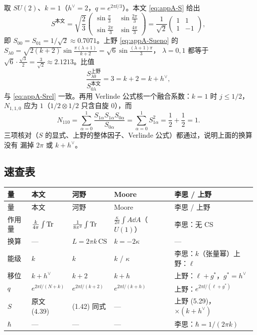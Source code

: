 取 $SU(2)$、$k=1$（$h^\vee=2$，$q=e^{2\pi\ii/3}$）。本文 \eqref{eq:appA-S} 给出
\begin{equation}
S^{\text{本文}}=\sqrt{\frac23}
\begin{pmatrix}
\sin\frac{\pi}{3} & \sin\frac{2\pi}{3}\\[2pt]
\sin\frac{2\pi}{3} & \sin\frac{4\pi}{3}
\end{pmatrix}
=\frac{1}{\sqrt2}
\begin{pmatrix}1&1\\1&-1\end{pmatrix},
\end{equation}
即 $S_{00}=S_{01}=1/\sqrt2\approx0.7071$。上野 \eqref{eq:appA-Sueno} 的
$S_{\lambda0}=\sqrt{2(k+2)}\sin\frac{\pi(\lambda+1)}{k+2}=\sqrt6\sin\frac{(\lambda+1)\pi}{3}$，
$\lambda=0,1$ 都等于 $\sqrt6\cdot\frac{\sqrt3}{2}=\frac{3}{\sqrt2}\approx2.1213$。比值
\begin{equation}
\frac{S_{\lambda0}^{\text{上野}}}{S_{0\lambda}^{\text{本文}}}=3=k+2=k+h^\vee,
\end{equation}
与 \eqref{eq:appA-Srel} 一致。再用 Verlinde 公式核一个融合系数：$k=1$ 时
$j\le1/2$，$N_{1,1,0}$ 应为 $1$（$1/2\otimes1/2$ 只含自旋 $0$），而
\begin{equation}
N_{110}=\sum_{\alpha=0}^{1}\frac{S_{1\alpha}S_{1\alpha}S_{0\alpha}}{S_{0\alpha}}
=\sum_{\alpha=0}^{1}S_{1\alpha}^2=\frac12+\frac12=1 .
\end{equation}
三项核对（$S$ 的显式、上野的整体因子、Verlinde 公式）都通过，说明上面的换算没有
漏掉 $2\pi$ 或 $k+h^\vee$。

\subsection{速查表}

\begin{center}
\footnotesize
\begin{longtable}{@{}p{1.8cm}p{2.5cm}p{2.4cm}p{2.4cm}p{3.4cm}@{}}
\toprule
量 & 本文 & 河野 & Moore & 李思 / 上野 \\
\midrule
\endfirsthead
\toprule
量 & 本文 & 河野 & Moore & 李思 / 上野 \\
\midrule
\endhead
作用量 & $\frac{k}{4\pi}\int\operatorname{Tr}$ & $\frac{1}{8\pi^2}\int\operatorname{Tr}$ & $\frac{\kappa}{2\pi}\int A\dd A$（$U(1)$） & 李思：无 CS \\
换算 & — & $L=2\pi k\,\mathrm{CS}$ & $k=-2\kappa$ & — \\
能级 & $k$ & $k$ & $k$ / $\kappa$ & 李思：$k$（张量幂）\newline 上野：$\ell$ \\
移位 & $k+h^\vee$ & $k+2$ & $k+h$ & 上野：$\ell+g^*$，$g^*=h^\vee$ \\
$q$ & $e^{2\pi\ii/(N+k)}$ & $e^{2\pi\ii/(k+2)}$ & $e^{2\pi\ii/(k+h)}$ & 上野：$e^{2\pi\ii/(\ell+g^*)}$ \\
$S$ & 原文 (4.39) & (1.42) 同式 & — & 上野 (5.29)，$\times(k+h^\vee)$ \\
$\hbar$ & — & — & — & 李思：$\hbar=1/(2\pi k)$ \\
\bottomrule
\end{longtable}
\end{center}

